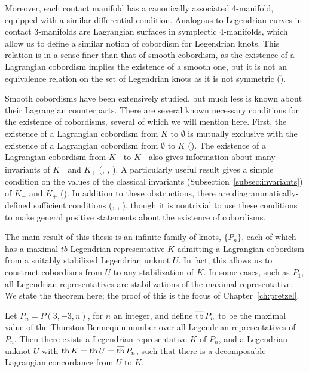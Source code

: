 
Moreover, each contact manifold has a canonically associated 4-manifold, equipped with a similar differential condition. Analogous to Legendrian curves in contact 3-manifolds are Lagrangian surfaces in symplectic 4-manifolds, which allow us to define a similar notion of cobordism for Legendrian knots.
This relation is in a sense finer than that of smooth cobordism, as the existence of a Lagrangian cobordism implies the existence of a smooth one, but it is not an equivalence relation on the set of Legendrian knots as it is not symmetric (\cite{chantraine2015}).

Smooth cobordisms have been extensively studied, but much less is known about their Lagrangian counterparts. There are several known necessary conditions for the existence of cobordisms, several of which we will mention here.
First, the existence of a Lagrangian cobordism from $K$ to $\emptyset$ is mutually exclusive with the existence of a Lagrangian cobordism from $\emptyset$ to $K$ (\cite{gromov}).
The existence of a Lagrangian cobordism from $K_-$ to $K_+$ also gives information about many invariants of $K_-$ and $K_+$ (\cite{pan}, \cite{cdrg}, \cite{baldwin}). 
A particularly useful result gives a simple condition on the values of the classical invariants (Subsection~\ref{subsec:invariants}) of $K_-$ and $K_+$ (\cite{chantraine2010}).
In addition to these obstructions, there are diagrammatically-defined sufficient conditions (\cite{bourgeois15}, \cite{lin}, \cite{guadagni}), though it is nontrivial to use these conditions to make general positive statements about the existence of cobordisms.

The main result of this thesis is an infinite family of knots, $\{P_n\}$, each of which has a maximal-$tb$ Legendrian representative $K$ admitting a Lagrangian cobordism from a suitably stabilized Legendrian unknot $U$. In fact, this allows us to construct cobordisms from $U$ to any stabilization of $K$. In some cases, such as $P_1$, all Legendrian representatives are stabilizations of the maximal representative.
We state the theorem here; the proof of this is the focus of Chapter~\ref{ch:pretzel}.

\begin{mythmcopy}
     Let $P_n = P(3, -3, n)$, for $n$ an integer, and define $\overline{\operatorname{tb}}\, P_n$ to be the maximal value of the Thurston-Bennequin number over all Legendrian representatives of $P_n$. Then there exists a Legendrian representative $K$ of $P_n$, and a Legendrian unknot $U$ with $\operatorname{tb} K = \operatorname{tb} U = \overline{\operatorname{tb}}\, P_n$, such that there is a decomposable Lagrangian concordance from $U$ to $K$.
\end{mythmcopy}


